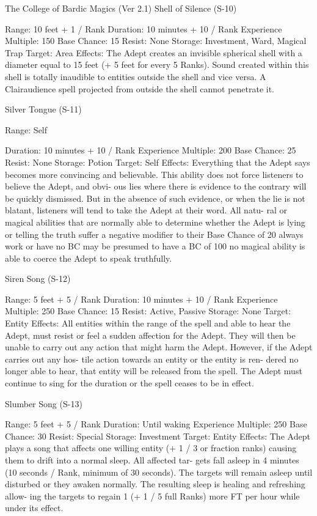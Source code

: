 \begin{Chapter}{The College of Bardic Magics (Ver 2.1)}
Shell of Silence (S-10) 

Range: 10 feet + 1 / Rank 
Duration: 10 minutes + 10 / Rank 
Experience Multiple: 150 
Base Chance: 15%
Resist: None 
Storage: Investment, Ward, Magical Trap 
Target: Area 
Effects:  The  Adept  creates  an  invisible  spherical 
shell  with a diameter equal to 15 feet (+ 5 feet for 
every  5  Ranks).  Sound  created  within  this  shell  is 
totally  inaudible  to  entities  outside  the  shell  and 
vice  versa.  A  Clairaudience  spell  projected  from 
outside the shell cannot penetrate it. 

Silver Tongue (S-11) 

Range: Self 

Duration: 10 minutes + 10 / Rank 
Experience Multiple: 200 
Base Chance: 25%
Resist: None 
Storage: Potion 
Target: Self 
Effects:  Everything  that  the  Adept  says  becomes 
more  convincing  and  believable.  This  ability  does 
not  force  listeners  to  believe  the  Adept,  and  obvi-
ous lies where there is evidence to the contrary will 
be  quickly  dismissed.  But  in  the  absence  of  such 
evidence,  or  when  the  lie  is  not  blatant,  listeners 
will tend to take the Adept at their word. All natu-
ral  or  magical  abilities  that  are  normally  able  to 
determine whether the Adept is lying or telling the 
truth  suffer  a  negative  modifier  to  their  Base 
Chance  of  20%
always  work  or  have  no  BC  may  be  presumed  to 
have a BC of 100%
no  magical  ability  is  able  to  coerce  the  Adept  to 
speak truthfully. 

Siren Song (S-12) 

Range: 5 feet + 5 / Rank 
Duration: 10 minutes + 10 / Rank 
Experience Multiple: 250 
Base Chance: 15%
Resist: Active, Passive 
Storage: None 
Target: Entity 
Effects:  All  entities  within  the  range  of  the  spell 
and  able  to  hear  the  Adept,  must  resist  or  feel  a 
sudden  affection  for  the  Adept.  They  will  then  be 
unable to carry out any action that might harm the 
Adept. However, if the  Adept carries out any hos-
tile  action  towards  an  entity  or  the  entity  is  ren-
dered  no  longer  able  to  hear,  that  entity  will  be 
released  from  the  spell.  The  Adept  must  continue 
to sing for the duration or the spell ceases to be in 
effect. 

Slumber Song (S-13) 

Range: 5 feet + 5 / Rank 
Duration: Until waking 
Experience Multiple: 250 
Base Chance: 30%
Resist: Special 
Storage: Investment 
Target: Entity 
Effects:  The  Adept  plays  a  song  that  affects  one 
willing  entity  (+  1  /  3  or  fraction  ranks)  causing 
them to  drift into  a  normal  sleep.  All  affected  tar-
gets  fall  asleep  in  4  minutes  (10  seconds  /  Rank, 
minimum  of  30  seconds).  The  targets  will  remain 
asleep  until  disturbed  or  they  awaken  normally. 
The resulting sleep is healing and refreshing allow-
ing the targets to regain 1 (+ 1 / 5 full Ranks) more 
FT per hour while under its effect. 


\end{Chapter}
